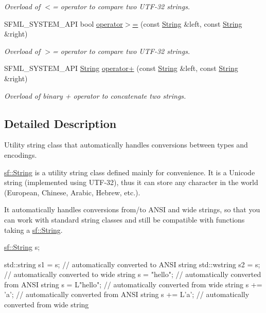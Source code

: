 \begin{DoxyCompactItemize}
\begin{DoxyCompactList}\small\item\em Overload of $<$= operator to compare two U\+T\+F-\/32 strings. \end{DoxyCompactList}\item 
S\+F\+M\+L\+\_\+\+S\+Y\+S\+T\+E\+M\+\_\+\+A\+PI bool \hyperlink{classsf_1_1_string_a8d2979d7829d6616330a768956f251e1}{operator$>$=} (const \hyperlink{classsf_1_1_string}{String} \&left, const \hyperlink{classsf_1_1_string}{String} \&right)
\begin{DoxyCompactList}\small\item\em Overload of $>$= operator to compare two U\+T\+F-\/32 strings. \end{DoxyCompactList}\item 
S\+F\+M\+L\+\_\+\+S\+Y\+S\+T\+E\+M\+\_\+\+A\+PI \hyperlink{classsf_1_1_string}{String} \hyperlink{classsf_1_1_string_a55ef2bf7dc6b295ef7127b0bc1e58760}{operator+} (const \hyperlink{classsf_1_1_string}{String} \&left, const \hyperlink{classsf_1_1_string}{String} \&right)
\begin{DoxyCompactList}\small\item\em Overload of binary + operator to concatenate two strings. \end{DoxyCompactList}\end{DoxyCompactItemize}


\subsection{Detailed Description}
Utility string class that automatically handles conversions between types and encodings. 

\hyperlink{classsf_1_1_string}{sf\+::\+String} is a utility string class defined mainly for convenience. It is a Unicode string (implemented using U\+T\+F-\/32), thus it can store any character in the world (European, Chinese, Arabic, Hebrew, etc.).

It automatically handles conversions from/to A\+N\+SI and wide strings, so that you can work with standard string classes and still be compatible with functions taking a \hyperlink{classsf_1_1_string}{sf\+::\+String}.


\begin{DoxyCode}
\hyperlink{classsf_1_1_string}{sf::String} s;

std::string s1 = s;  \textcolor{comment}{// automatically converted to ANSI string}
std::wstring s2 = s; \textcolor{comment}{// automatically converted to wide string}
s = \textcolor{stringliteral}{"hello"};         \textcolor{comment}{// automatically converted from ANSI string}
s = L\textcolor{stringliteral}{"hello"};        \textcolor{comment}{// automatically converted from wide string}
s += \textcolor{charliteral}{'a'};            \textcolor{comment}{// automatically converted from ANSI string}
s += L\textcolor{charliteral}{'a'};           \textcolor{comment}{// automatically converted from wide string}
\end{DoxyCode}


